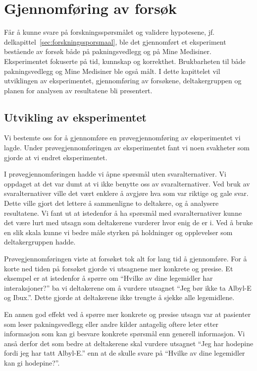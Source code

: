 \chapter{Gjennomføring av forsøk}\label{chap:gjennomforing}
Får å kunne svare på forskningsspørsmålet og validere hypotesene, jf. delkapittel~\ref{sec:forskningssporsmaal}, ble det gjennomført et eksperiment bestående av forsøk både på pakningsvedlegg og på Mine Medisiner. Eksperimentet fokuserte på tid, kunnskap og korrekthet. Brukbarheten til både pakningsvedlegg og Mine Medisiner ble også målt. I dette kapittelet vil utviklingen av eksperimentet, gjennomføring av forsøkene, deltakergruppen og planen for analysen av resultatene bli presentert.



\section{Utvikling av eksperimentet}
Vi bestemte oss for å gjennomføre en prøvegjennomføring av eksperimentet vi lagde. Under prøvegjennomføringen av eksperimentet fant vi noen svakheter som gjorde at vi endret eksperimentet. 

I prøvegjennomføringen hadde vi åpne spørsmål uten svaralternativer. Vi oppdaget at det var dumt at vi ikke benytte oss av svaralternativer. Ved bruk av svaralternativer ville det vært enklere å avgjøre hva som var riktige og gale svar. Dette ville gjort det lettere å sammenligne to deltakere, og å analysere resultatene. Vi fant ut at istedenfor å ha spørsmål med svaralternativer kunne det være lurt med utsagn som deltakerene vurderer hvor enig de er i. Ved å bruke en slik skala kunne vi bedre måle styrken på holdninger og opplevelser som deltakergruppen hadde. 

Prøvegjennomføringen viste at forsøket tok alt for lang tid å gjennomføre. For å korte ned tiden på forsøket gjorde vi utsagnene mer konkrete og presise. Et eksempel er at istedenfor å spørre om “Hvilke av dine legemidler har interaksjoner?” ba vi deltakerene om å vurdere utsagnet “Jeg bør ikke ta Albyl-E og Ibux.”. Dette gjorde at deltakerene ikke trengte å sjekke alle legemidlene.

En annen god effekt ved å spørre mer konkrete og presise utsagn var at pasienter som leser pakningsvedlegg eller andre kilder antagelig oftere leter etter informasjon som kan gi besvare konkrete spørsmål enn generell informasjon. Vi anså derfor det som bedre at deltakerene skal vurdere utsagnet “Jeg har hodepine fordi jeg har tatt Albyl-E.” enn at de skulle svare på “Hvilke av dine legemidler kan gi hodepine?”.

